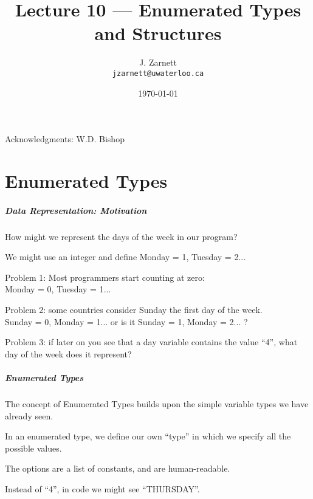 

\title{Lecture 10 --- Enumerated Types and Structures}

\author{J. Zarnett\\
\texttt{jzarnett@uwaterloo.ca}}
\date{\today}



\begin{frame}
  \titlepage
  
  \begin{center}
  \small{Acknowledgments: W.D. Bishop}
  \end{center}
 \end{frame}
 
\part{Enumerated Types}
\begin{frame}\partpage\end{frame}

\begin{frame}
\frametitle{Data Representation: Motivation}

How might we represent the days of the week in our program?

We might use an integer and define Monday = 1, Tuesday = 2...

Problem 1: Most programmers start counting at zero:\\
\quad Monday = 0, Tuesday = 1...

Problem 2: some countries consider Sunday the first day of the week.\\
\quad Sunday = 0, Monday = 1... or is it Sunday = 1, Monday = 2... ?

Problem 3: if later on you see that a day variable contains the value ``4'', what day of the week does it represent?

\end{frame}

\begin{frame}
\frametitle{Enumerated Types}


The concept of \alert{Enumerated Types} builds upon the simple variable types we have already seen.

In an enumerated type, we define our own ``type'' in which we specify all the possible values.

The options are a list of constants, and are human-readable.

Instead of ``4'', in code we might see ``THURSDAY''.

\end{frame}

